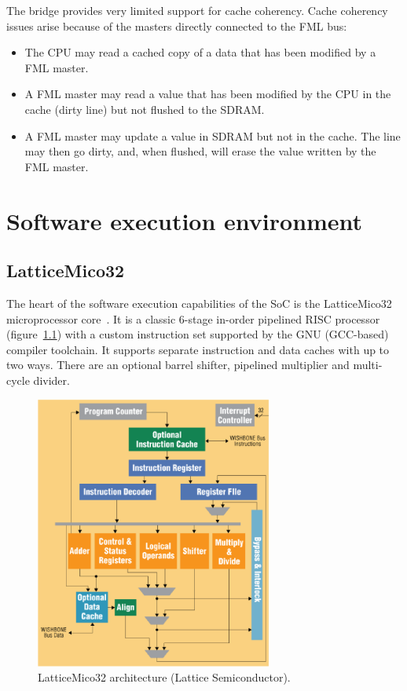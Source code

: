 \documentclass[a4paper,11pt]{kthesis}
\begin{document}
The bridge provides very limited support for cache coherency. Cache coherency issues arise because of the masters directly connected to the FML bus:
\begin{itemize}
\item The CPU may read a cached copy of a data that has been modified by a FML master.
\item A FML master may read a value that has been modified by the CPU in the cache (dirty line) but not flushed to the SDRAM.
\item A FML master may update a value in SDRAM but not in the cache. The line may then go dirty, and, when flushed, will erase the value written by the FML master.
\end{itemize}

\chapter{Software execution environment}
\section{LatticeMico32}
The heart of the software execution capabilities of the SoC is the LatticeMico32 microprocessor core~\cite{mico32}. It is a classic 6-stage in-order pipelined RISC processor (figure~\ref{fig:lm32arch}) with a custom instruction set supported by the GNU (GCC-based) compiler toolchain. It supports separate instruction and data caches with up to two ways. There are an optional barrel shifter, pipelined multiplier and multi-cycle divider.

\begin{figure}[htp]
\centering
\includegraphics[height=90mm]{lm32arch.eps}
\caption{LatticeMico32 architecture (Lattice Semiconductor).}
\label{fig:lm32arch}
\end{figure}
\end{document}
